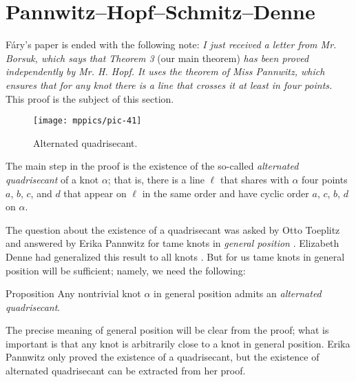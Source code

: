 \section{Pannwitz--Hopf--Schmitz--Denne}\label{sec:quadrisecant}

Fáry's paper \cite{fary} is ended with the following note:
\textit{I just received a letter from Mr. Borsuk, which says that Theorem 3} (our main theorem) \textit{has been proved independently by Mr. H. Hopf.
It uses the theorem of Miss Pannwitz, which ensures that for any knot there is a line that crosses it at least in four
points.}
This proof is the subject of this section.

{

\begin{wrapfigure}{r}{22 mm}
\vskip-0mm
\centering
\texttt{[image: mppics/pic-41]}
\caption*{Alternated quadrisecant.}
\vskip0mm
\end{wrapfigure}

The main step in the proof is the existence of the so-called \emph{alternated quadrisecant} of a knot $\alpha$; that is, there is a line $\ell$ that shares with $\alpha$ four points $a$, $b$, $c$, and $d$
that appear on $\ell$ in the same order and have cyclic order $a$, $c$, $b$, $d$ on $\alpha$.

The question about the existence of a quadrisecant was asked by Otto Toep\-litz and answered by Erika Pannwitz for tame knots in \emph{general position} \cite{pannwitz}.
Elizabeth Denne had generalized this result to all knots \cite{denne, denne-survey}.
But for us tame knots in general position will be sufficient;
namely, we need the following:

}

\begin{thm}{Proposition}\label{prop:quadrisecant}
Any nontrivial knot $\alpha$ in general position admits an \emph{alternated quadrisecant}.
\end{thm}

The precise meaning of general position will be clear from the proof;
what is important is that any knot is arbitrarily close to a knot in general position.
Erika Pannwitz only proved the existence of a quadrisecant, but the existence of alternated quadrisecant can be extracted from her proof.

